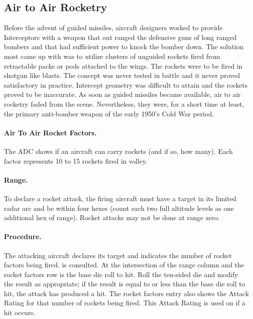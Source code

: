 
\begin{advancedrules}

\section{Air to Air Rocketry}

\label{rule:air-to-air-rocket-combat}

Before the advent of guided missiles, aircraft designers worked to provide Interceptors with a weapon that out ranged the defensive guns of long ranged bombers and that had sufficient power to knock the bomber down. The solution most came up with was to utilize clusters of unguided rockets fired from retractable packs or pods attached to the wings. The rockets were to be fired in shotgun like blasts. The concept was never tested in battle and it never proved satisfactory in practice. Intercept geometry was difficult to attain and the rockets proved to be inaccurate. As soon as guided missiles became available, air to air rocketry faded from the scene. Nevertheless, they were, for a short time at least, the primary anti-bomber weapon of the early 1950's Cold War period.

\paragraph{Air To Air Rocket Factors.} The ADC shows if an aircraft can carry rockets (and if so, how many). Each factor represents 10 to 15 rockets fired in volley.

\paragraph{Range.} To declare a rocket attack, the firing aircraft must have a target in its limited radar arc and be within four hexes (count each two full altitude levels as one additional hex of range). Rocket attacks may not be done at range zero.

\paragraph{Procedure.} The attacking aircraft declares its target and indicates the number of rocket factors being fired.  is consulted. At the intersection of the range column and the rocket factors row is the base die roll to hit. Roll the ten-sided die and modify the result as appropriate; if the result is equal to or less than the base die roll to hit, the attack has produced a hit. The rocket factors entry also shows the Attack Rating for that number of rockets being fired. This Attack Rating is used on  if a hit occurs.


\end{advancedrules}

